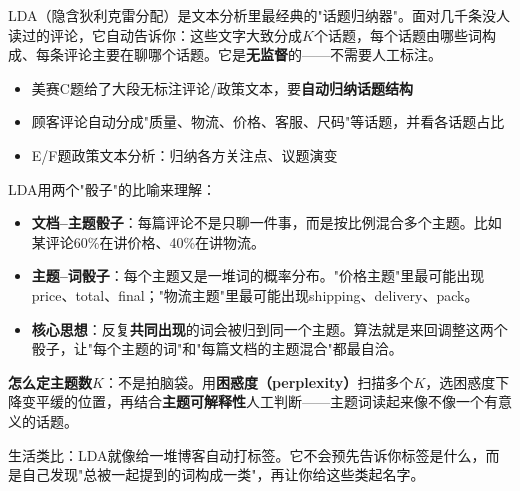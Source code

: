 
\begin{algointro}
LDA（隐含狄利克雷分配）是文本分析里最经典的"话题归纳器"。面对几千条没人读过的评论，它自动告诉你：这些文字大致分成$K$个话题，每个话题由哪些词构成、每条评论主要在聊哪个话题。它是\textbf{无监督}的——不需要人工标注。
\end{algointro}

\begin{algoscene}
\begin{itemize}
    \item 美赛C题给了大段无标注评论/政策文本，要\textbf{自动归纳话题结构}
    \item 顾客评论自动分成"质量、物流、价格、客服、尺码"等话题，并看各话题占比
    \item E/F题政策文本分析：归纳各方关注点、议题演变
\end{itemize}
\end{algoscene}

\begin{algoprinciple}
LDA用两个"骰子"的比喻来理解：

\begin{itemize}
    \item \textbf{文档--主题骰子}：每篇评论不是只聊一件事，而是按比例混合多个主题。比如某评论60\%在讲价格、40\%在讲物流。
    \item \textbf{主题--词骰子}：每个主题又是一堆词的概率分布。"价格主题"里最可能出现price、total、final；"物流主题"里最可能出现shipping、delivery、pack。
    \item \textbf{核心思想}：反复\textbf{共同出现}的词会被归到同一个主题。算法就是来回调整这两个骰子，让"每个主题的词"和"每篇文档的主题混合"都最自洽。
\end{itemize}

\textbf{怎么定主题数$K$}：不是拍脑袋。用\textbf{困惑度（perplexity）}扫描多个$K$，选困惑度下降变平缓的位置，再结合\textbf{主题可解释性}人工判断——主题词读起来像不像一个有意义的话题。

生活类比：LDA就像给一堆博客自动打标签。它不会预先告诉你标签是什么，而是自己发现"总被一起提到的词构成一类"，再让你给这些类起名字。
\end{algoprinciple}

